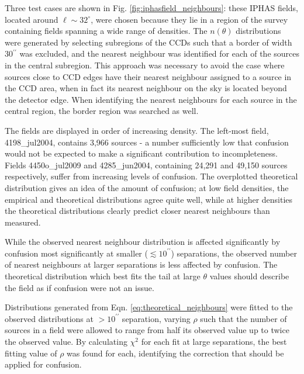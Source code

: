 \documentclass[a4paper,useAMS,usenatbib]{mn2e}
\begin{document}
Three test cases are shown in Fig. \ref{fig:iphasfield_neighbours}: these
IPHAS fields, located around $\ell\sim32^{\circ}$, were chosen because they lie in a
region of the survey containing fields spanning a wide range of densities. The
$n(\theta)$ distributions were generated by selecting subregions of the CCDs
such that a border of width 30$^{\prime\prime}$ was excluded, and the nearest
neighbour was identified for each of the sources in the central subregion. This
approach was necessary to avoid the case where sources close to CCD edges have
their nearest neighbour assigned to a source in the CCD area, when in fact its
nearest neighbour on the sky is located beyond the detector edge. When identifying 
the nearest neighbours for each source in the central region, the 
border region was searched as well.

The fields are displayed in order of increasing density. The left-most field,
4198\_jul2004, contains 3,966 sources - a number sufficiently low that confusion would 
not be expected to make a significant contribution to incompleteness. Fields 
4450o\_jul2009 and 4285\_jun2004, containing 24,291 and 49,150 sources respectively, 
suffer from increasing levels of confusion. The overplotted theoretical distribution 
gives an idea of the amount of confusion; at low field densities, the empirical and 
theoretical distributions agree quite well, while at higher densities the theoretical 
distributions clearly predict closer nearest neighbours than measured.

While the observed nearest neighbour distribution is affected significantly by
confusion most significantly at smaller ($\lesssim10^{\prime\prime}$) separations, the 
observed number of nearest neighbours at larger separations is
less affected by confusion. The theoretical distribution which best fits the
tail at large $\theta$ values should describe the field as if confusion were not an issue.

Distributions generated from Eqn. \ref{eq:theoretical_neighbours} were fitted to the observed distributions at $>10^{\prime\prime}$ separation, varying $\rho$ such that the number of sources in a field were allowed to range from half its observed value up to twice the observed value. By calculating $\chi^2$ for each fit at large separations, the best fitting value of $\rho$ was found for each, identifying the correction that should be applied for confusion.
\end{document}
